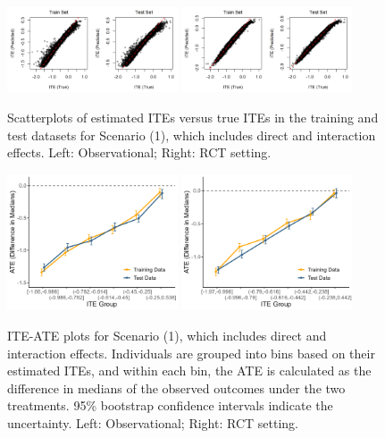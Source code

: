 \begin{figure}[htbp]
\centering
\includegraphics[width=0.45\textwidth]{img/results/observ_scenario1_ITE_scatter_train_test.png}
\includegraphics[width=0.45\textwidth]{img/results/rct_scenario1_ITE_scatter_train_test.png}
\caption{Scatterplots of estimated ITEs versus true ITEs in the training and test datasets for Scenario (1), which includes direct and interaction effects. Left: Observational; Right: RCT setting.}
\label{fig:scenario1_ite_scatter_train_test}
\end{figure}




\begin{figure}[htbp]
\centering
\includegraphics[width=0.45\textwidth]{img/results/observ_scenario1_ITE_cATE.png}
\includegraphics[width=0.45\textwidth]{img/results/rct_scenario1_ITE_cATE.png}
\caption{ITE-ATE plots for Scenario (1), which includes direct and interaction effects. Individuals are grouped into bins based on their estimated ITEs, and within each bin, the ATE is calculated as the difference in medians of the observed outcomes under the two treatments. 95\% bootstrap confidence intervals indicate the uncertainty. Left: Observational; Right: RCT setting.}
\label{fig:scenario1_ite_cATE}
\end{figure}



